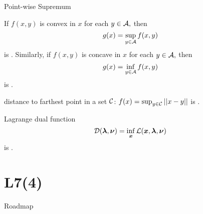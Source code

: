 \documentclass[handout,fleqn,aspectratio=169]{beamer}
\begin{document}

\begin{frame}{Point-wise Supremum}

\plitemsep 0.1in

\bci 

\item If $f(x,y)$ is convex in $x$ for each $y \in \mathcal A,$ then
$$g(x) = \sup_{y \in \mathcal A} f(x,y)$$
is . Similarly, if $f(x,y)$ is concave in $x$ for each $y \in \mathcal A,$ then
$$g(x) = \inf_{y \in \mathcal A} f(x,y)$$
is .

\item \exam distance to farthest point in a set $\mathcal C$: $f(x) = \sup_{y \in \mathcal C} || x-y ||$ is .

\item \exam Lagrange dual function 
$${\cal D}(\bm{\lambda},\bm{\nu})=\inf_{\bm{x}}
{\cal L}(\bm{x},\bm{\lambda},\bm{\nu})$$
is . 
\eci
\end{frame}

\section{L7(4)}
\begin{frame}{Roadmap}

\plitemsep 0.1in

\bce[(1)] 

\item {} 
\item {} 

\item {}
\item {} 
\item {}


\ece
\end{frame}

\end{document}

